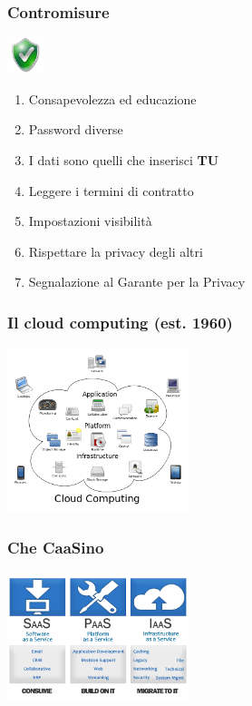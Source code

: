 \documentclass[xcolor=svgnames,handout]{beamer}
\begin{document}
\begin{frame}
		\frametitle{Contromisure}

	\begin{block}{\includegraphics[width=40px]{img/shield.png}}
			\begin{enumerate}
					\item Consapevolezza ed educazione
						\pause
					\item Password diverse
						\pause
					\item I dati sono quelli che inserisci {\bf TU}
						\pause
					\item Leggere i termini di contratto
						\pause
					\item Impostazioni visibilità
						\pause
					\item Rispettare la privacy degli altri
						\pause
					\item Segnalazione al Garante per la Privacy
			\end{enumerate}
	\end{block}
\end{frame}

\begin{frame}
	\frametitle{Il cloud computing (est. 1960)}

	\begin{center}
		\includegraphics[width=200px]{img/cloud1.png}
	\end{center}
\end{frame}

\begin{frame}
	\frametitle{Che CaaSino}

	\begin{center}
		\includegraphics[width=200px]{img/service.png}
	\end{center}
\end{frame}
\end{document}
